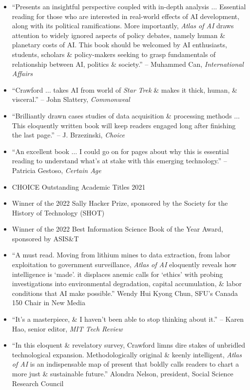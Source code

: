 \documentclass{article}
\begin{document}
\begin{enumerate}
\begin{itemize}
        \item ``Presents an insightful perspective coupled with in-depth analysis $\ldots$ Essential reading for those who are interested in real-world effects of AI development, along with its political ramifications. More importantly, {\it Atlas of AI} draws attention to widely ignored aspects of policy debates, namely human \& planetary costs of AI. This book should be welcomed by AI enthusiasts, students, scholars \& policy-makers seeking to grasp fundamentals of relationship between AI, politics \& society.'' -- {\sc Muhammed Can}, {\it International Affairs}
        \item ``{\sc Crawford} $\ldots$ takes AI from world of {\it Star Trek} \& makes it thick, human, \& visceral.'' -- {\sc John Slattery}, {\it Commonweal}
        \item ``Brilliantly drawn cases studies of data acquisition \& processing methods $\ldots$ This eloquently written book will keep readers engaged long after finishing the last page.'' -- {\sc J. Brzezinski}, {\it Choice}
        \item ``An excellent book $\ldots$ I could go on for pages about why this is essential reading to understand what's at stake with this emerging technology.'' -- {\sc Patricia Gestoso}, {\it Certain Age}
        \item CHOICE Outstanding Academic Titles 2021
        \item Winner of the 2022 Sally Hacker Prize, sponsored by the Society for the History of Technology (SHOT)
        \item  Winner of the 2022 Best Information Science Book of the Year Award, sponsored by ASIS\&T
        \item ``A must read. Moving from lithium mines to data extraction, from labor exploitation to government surveillance, {\it Atlas of AI} eloquently reveals how intelligence is `made'. it displaces anemic calls for `ethics' with probing investigations into environmental degradation, capital accumulation, \& labor conditions that AI make possible.'' {\sc Wendy Hui Kyong Chun}, SFU's Canada 150 Chair in New Media
        \item ``It's a masterpiece, \& I haven't been able to stop thinking about it.'' -- {\sc Karen Hao}, senior editor, {\it MIT Tech Review}
        \item ``In this eloquent \& revelatory survey, {\sc Crawford} limns dire stakes of unbridled technological expansion. Methodologically original \& keenly intelligent, {\it Atlas of AI} is an indispensable map of present that boldly calls readers to chart a more just \& sustainable future.'' {\sc Alondra Nelson}, president, Social Science Research Council

\end{itemize}
\end{enumerate}
\end{document}
